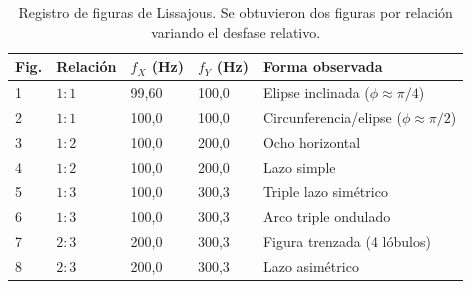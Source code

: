 \documentclass[12pt,a4paper]{article}
\begin{document}
\begin{table}[H]
\centering
\small
\setlength{\tabcolsep}{4pt}
\caption{Registro de figuras de Lissajous. Se obtuvieron dos figuras por relación variando el desfase relativo.}
\label{tab:lissajous}
\begin{tabular}{C{0.8cm}C{1.4cm}C{1.9cm}C{1.9cm}C{4.5cm}}
\toprule
Fig. & Relación & $f_X$ (Hz) & $f_Y$ (Hz) & Forma observada \\
 & $1{:}1$ & 99,60  & 100,0 & Elipse inclinada ($\phi \approx \pi/4$) \\
2 & $1{:}1$ & 100,0  & 100,0 & Circunferencia/elipse ($\phi \approx \pi/2$) \\
3 & $1{:}2$ & 100,0  & 200,0 & Ocho horizontal \\
4 & $1{:}2$ & 100,0  & 200,0 & Lazo simple \\
5 & $1{:}3$ & 100,0  & 300,3 & Triple lazo simétrico \\
6 & $1{:}3$ & 100,0  & 300,3 & Arco triple ondulado \\
7 & $2{:}3$ & 200,0  & 300,3 & Figura trenzada (4 lóbulos) \\
8 & $2{:}3$ & 200,0  & 300,3 & Lazo asimétrico \\
\bottomrule
\end{tabular}
\end{table}
\end{document}
